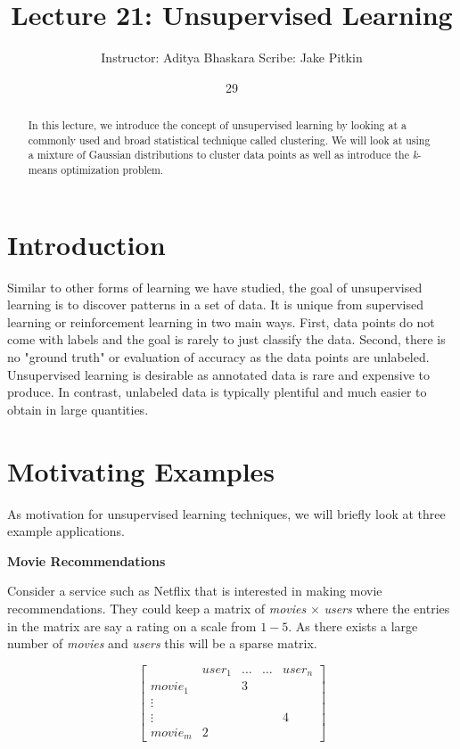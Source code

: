 \documentclass[english,course]{Notes}
\title{Lecture 21: Unsupervised Learning}
\author{Instructor: Aditya Bhaskara \qquad Scribe: Jake Pitkin}
\date{29}{03}{2017}
\begin{document}
\vspace{-10pt}
\begin{abstract}
In this lecture, we introduce the concept of unsupervised learning by looking at a commonly used and broad statistical technique called clustering. We will look at using a mixture of Gaussian distributions to cluster data points as well as introduce the \textit{k}-means optimization problem.
\end{abstract}

\section{Introduction}

Similar to other forms of learning we have studied, the goal of unsupervised learning is to discover patterns in a set of data. It is unique from supervised learning or reinforcement learning in two main ways. First, data points do not come with labels and the goal is rarely to just classify the data. Second, there is no "ground truth" or evaluation of accuracy as the data points are unlabeled. Unsupervised learning is desirable as annotated data is rare and expensive to produce. In contrast, unlabeled data is typically plentiful and much easier to obtain in large quantities.

\section{Motivating Examples}

As motivation for unsupervised learning techniques, we will briefly look at three example applications.

\textbf{Movie Recommendations}

Consider a service such as Netflix that is interested in making movie recommendations. They could keep a matrix of \textit{movies} $\times$ \textit{users} where the entries in the matrix are say a rating on a scale from $1-5$. As there exists a large number of \textit{movies} and \textit{users} this will be a sparse matrix.

$$\begin{bmatrix}
  & user_1  & \dots & \dots & user_n\\
    movie_1 & & 3\\
    \vdots  \\
    \vdots  & & & & 4\\
    movie_m & 2
\end{bmatrix} $$ 
\end{document}
